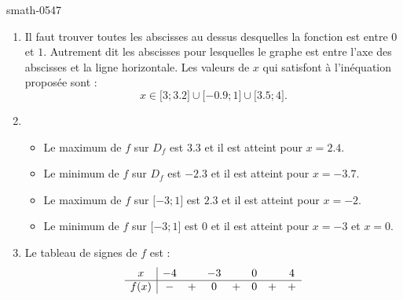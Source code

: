 \begin{corrige}{smath-0547}
\begin{enumerate}
        \item
            Il faut trouver toutes les abscisses au dessus desquelles la fonction est entre \( 0\) et \( 1\). Autrement dit les abscisses pour lesquelles le graphe est entre l'axe des abscisses et la ligne horizontale. Les valeurs de \( x\) qui satisfont à l'inéquation proposée sont :
            \begin{equation}
                x\in\mathopen[ 3 ; 3.2 \mathclose]\cup\mathopen[ -0.9 ; 1 \mathclose]\cup\mathopen[ 3.5 ; 4 \mathclose].
            \end{equation}
        \item
            \begin{itemize}
                \item  Le maximum de \( f\) sur \( D_f\) est \( 3.3\) et il est atteint pour \( x=2.4\).
                \item  Le minimum de \( f\) sur \( D_f\) est \( -2.3\) et il est atteint pour \( x=-3.7\).
                \item  Le maximum de \( f\) sur \( \mathopen[ -3 ; 1 \mathclose]\) est \( 2.3\) et il est atteint pour \( x=-2\).
                \item  Le minimum de \( f\) sur \( \mathopen[ -3 ; 1 \mathclose]\) est \( 0\) et il est atteint pour \( x=-3\) et \( x=0\).
            \end{itemize}
        \item
            Le tableau de signes de \( f\) est :
            \begin{equation*}
                \begin{array}[]{c|ccccccc}
                    x&-4&&-3&&0&&4\\
                    \hline
                    f(x)&-&+&0&+&0&+&+\\
                \end{array}
            \end{equation*}
            
    \end{enumerate} 

\end{corrige}
